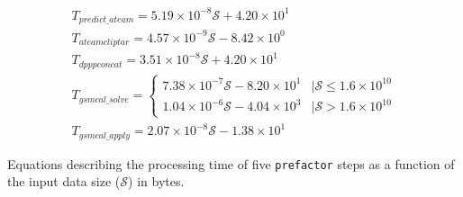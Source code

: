 \begin{equ*}
\begin{subequations}
\begin{align}
        T_{predict\_ateam}=5.19\times10^{-8}\mathcal{S}+4.20\times10^1 \label{eq:predictateam} \\
        T_{ateamcliptar}=4.57\times10^{-9}\mathcal{S}-8.42\times10^0 \label{eq:ateamcliptar} \\
        T_{dpppconcat}=3.51\times10^{-8}\mathcal{S}+4.20\times10^1 \label{eq:dpppconcat} \\
        T_{gsmcal\_solve}=\begin{cases}
                          7.38\times10^{-7}\mathcal{S}-8.20\times10^1 &|\mathcal{S}\leq1.6\times10^{10}\\
                          1.04\times10^{-6}\mathcal{S}-4.04\times10^3 & |\mathcal{S}>1.6\times10^{10}
    \end{cases} \label{eq:gsmcalsolve} \\
        T_{gsmcal\_apply}=2.07\times10^{-8}\mathcal{S}-1.38\times10^1 \label{eq:gsmcalapply}    
\end{align}
\label{eq:runtime_size_models}
\end{subequations}
\caption{Equations describing the processing time of five \texttt{prefactor} steps as a function of the input data size ($\mathcal{S}$) in bytes.}
\end{equ*}


